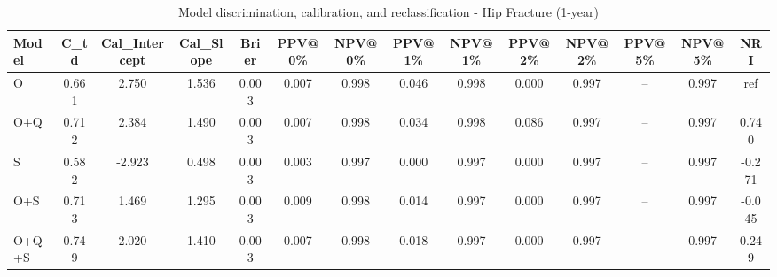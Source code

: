\begin{table}[htbp]
\centering
\small
\caption{Model discrimination, calibration, and reclassification - Hip Fracture (1-year)}
\label{tab:perf_pd_1y}
\begin{tabular}{lccccccccccccc}
\toprule
Model & C\_td & Cal\_Intercept & Cal\_Slope & Brier & PPV@0\% & NPV@0\% & PPV@1\% & NPV@1\% & PPV@2\% & NPV@2\% & PPV@5\% & NPV@5\% & NRI \\
\midrule
O & 0.661 & 2.750 & 1.536 & 0.003 & 0.007 & 0.998 & 0.046 & 0.998 & 0.000 & 0.997 & -- & 0.997 & ref \\
O+Q & 0.712 & 2.384 & 1.490 & 0.003 & 0.007 & 0.998 & 0.034 & 0.998 & 0.086 & 0.997 & -- & 0.997 & 0.740 \\
S & 0.582 & -2.923 & 0.498 & 0.003 & 0.003 & 0.997 & 0.000 & 0.997 & 0.000 & 0.997 & -- & 0.997 & -0.271 \\
O+S & 0.713 & 1.469 & 1.295 & 0.003 & 0.009 & 0.998 & 0.014 & 0.997 & 0.000 & 0.997 & -- & 0.997 & -0.045 \\
O+Q+S & 0.749 & 2.020 & 1.410 & 0.003 & 0.007 & 0.998 & 0.018 & 0.997 & 0.000 & 0.997 & -- & 0.997 & 0.249 \\
\bottomrule
\end{tabular}
\end{table}
